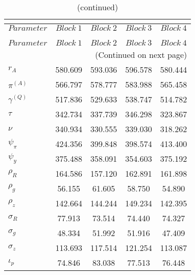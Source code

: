  
\begin{center}
\begin{longtable}{lcccc} 
\caption{MCMC Inefficiency factors per block}\\
 \label{Table:MCMC_inefficiency_factors}\\
\toprule 
$Parameter         $	 & 	 $     Block~1$	 & 	 $     Block~2$	 & 	 $     Block~3$	 & 	 $     Block~4$\\
\midrule \endfirsthead 
\caption{(continued)}\\
 \toprule \\ 
$Parameter         $	 & 	 $     Block~1$	 & 	 $     Block~2$	 & 	 $     Block~3$	 & 	 $     Block~4$\\
\midrule \endhead 
\midrule \multicolumn{5}{r}{(Continued on next page)} \\ \bottomrule \endfoot 
\bottomrule \endlastfoot 
$ {r_{A}}          $	 & 	     580.609	 & 	     593.036	 & 	     596.578	 & 	     580.444 \\ 
$ {\pi^{(A)}}      $	 & 	     566.797	 & 	     578.777	 & 	     583.988	 & 	     565.458 \\ 
$ {\gamma^{(Q)}}   $	 & 	     517.836	 & 	     529.633	 & 	     538.747	 & 	     514.782 \\ 
$ {\tau}           $	 & 	     342.734	 & 	     337.739	 & 	     346.298	 & 	     323.867 \\ 
$ {\nu}            $	 & 	     340.934	 & 	     330.555	 & 	     339.030	 & 	     318.262 \\ 
$ {\psi_\pi}       $	 & 	     424.356	 & 	     399.848	 & 	     398.574	 & 	     413.400 \\ 
$ {\psi_y}         $	 & 	     375.488	 & 	     358.091	 & 	     354.603	 & 	     375.192 \\ 
$ {\rho_R}         $	 & 	     164.586	 & 	     157.120	 & 	     162.891	 & 	     161.898 \\ 
$ {\rho_{g}}       $	 & 	      56.155	 & 	      61.605	 & 	      58.750	 & 	      54.890 \\ 
$ {\rho_z}         $	 & 	     142.664	 & 	     144.244	 & 	     149.234	 & 	     142.395 \\ 
$ {\sigma_R}       $	 & 	      77.913	 & 	      73.514	 & 	      74.440	 & 	      74.327 \\ 
$ {\sigma_{g}}     $	 & 	      48.334	 & 	      51.992	 & 	      51.916	 & 	      47.409 \\ 
$ {\sigma_z}       $	 & 	     113.693	 & 	     117.514	 & 	     121.254	 & 	     113.087 \\ 
$ {\iota_p}        $	 & 	      74.846	 & 	      83.038	 & 	      77.513	 & 	      76.448 \\ 
\end{longtable}
 \end{center}
